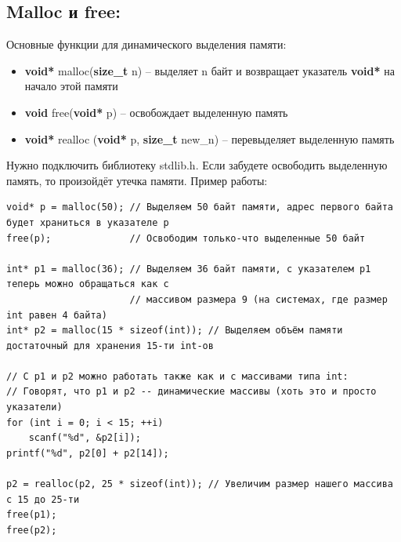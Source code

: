 \documentclass{article}
\begin{document}
\subsection*{Malloc и free:}
Основные функции для динамического выделения памяти:
\begin{itemize}
\item \textbf{void*} malloc(\textbf{size\_t} n) -- выделяет n байт и возвращает указатель \textbf{void*}
на начало этой памяти \\
\item \textbf{void} free(\textbf{void*} p) -- освобождает выделенную память\\
\item \textbf{void*} realloc (\textbf{void*} p, \textbf{size\_t} new\_n) -- перевыделяет выделенную память\\
\end{itemize}
Нужно подключить библиотеку stdlib.h. Если забудете освободить выделенную память, то произойдёт утечка памяти.
Пример работы:
\begin{verbatim}
void* p = malloc(50); // Выделяем 50 байт памяти, адрес первого байта будет храниться в указателе p
free(p);              // Освободим только-что выделенные 50 байт

int* p1 = malloc(36); // Выделяем 36 байт памяти, с указателем p1 теперь можно обращаться как с
                      // массивом размера 9 (на системах, где размер int равен 4 байта)
int* p2 = malloc(15 * sizeof(int)); // Выделяем объём памяти достаточный для хранения 15-ти int-ов

// C p1 и p2 можно работать также как и с массивами типа int:
// Говорят, что p1 и p2 -- динамические массивы (хоть это и просто указатели)
for (int i = 0; i < 15; ++i)
    scanf("%d", &p2[i]);
printf("%d", p2[0] + p2[14]);

p2 = realloc(p2, 25 * sizeof(int)); // Увеличим размер нашего массива с 15 до 25-ти
free(p1);
free(p2);
\end{verbatim}
\end{document}
